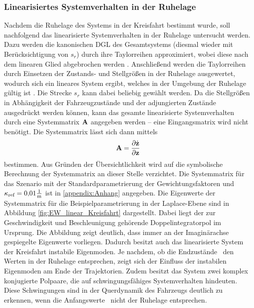 \subsubsection{Linearisiertes Systemverhalten in der Ruhelage}\label{subsubsec:Linearisierung}
Nachdem die Ruhelage des Systems in der Kreisfahrt bestimmt wurde, soll nachfolgend das linearisierte Systemverhalten in der Ruhelage untersucht werden. Dazu werden die kanonischen \gls{DGL} des Gesamtsystems (diesmal wieder mit Berücksichtigung von $s_r$) durch ihre Taylorreihen approximiert, wobei diese nach dem linearen Glied abgebrochen werden \cite{Modellbildung}. Anschließend werden die Taylorreihen durch Einsetzen der Zustands- und Stellgrößen in der Ruhelage ausgewertet, wodurch sich ein lineares System ergibt, welches in der Umgebung der Ruhelage gültig ist \cite{Modellbildung}. Die Strecke $s_r$ kann dabei beliebig gewählt werden. Da die Stellgrößen in Abhängigkeit der Fahrzeugzustände und der adjungierten Zustände ausgedrückt werden können, kann das gesamte linearisierte Systemverhalten durch eine Systemmatrix ${\boldsymbol{\mathrm{A}}}$ angegeben werden -- eine Eingangsmatrix wird nicht benötigt. Die Systemmatrix lässt sich dann mittels
\begin{equation}
{\ensuremath{\boldsymbol{\mathrm{A}}}} = \frac{\partial \dot{\boldsymbol{\mathrm{z}}}}{\partial \boldsymbol{\mathrm{z}}}
\end{equation}
bestimmen. Aus Gründen der Übersichtlichkeit wird auf die symbolische Berechnung der Systemmatrix an dieser Stelle verzichtet. Die Systemmatrix für das Szenario mit der Standardparametrierung der Gewichtungsfaktoren und $\kappa_{\textrm{ref}} = 0{,}01\frac{1}{\mathrm{m}}$ ist in \ref{appendix:Anhang} angegeben. Die Eigenwerte der Systemmatrix für die Beispielparametrierung in der Laplace-Ebene sind in Abbildung \ref{fig:EW_linear_Kreisfahrt} dargestellt. Dabei liegt der zur Geschwindigkeit und Beschleunigung gehörende Doppelintegratorpol im Ursprung. Die Abbildung zeigt deutlich, dass immer an der Imaginärachse gespiegelte Eigenwerte vorliegen. Dadurch besitzt auch das linearisierte System der Kreisfahrt instabile Eigenmoden. Je nachdem, ob die Endzustände \zoftf~den Werten in der Ruhelage entsprechen, zeigt sich der Einfluss der instabilen Eigenmoden am Ende der Trajektorien. Zudem besitzt das System zwei komplex konjugierte Polpaare, die auf schwingungsfähiges Systemverhalten hindeuten. Diese Schwingungen sind in der Querdynamik des Fahrzeugs deutlich zu erkennen, wenn die Anfangswerte \zzero~nicht der Ruhelage entsprechen.
